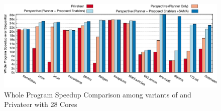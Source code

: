 

\begin{figure}[ht]
  \includegraphics[width=\textwidth]{figures/compare-privateer}
  \caption{Whole Program Speedup Comparison among variants of \name and Privateer with 28 Cores}
  \label{fig:speedup-compare}
\end{figure}








